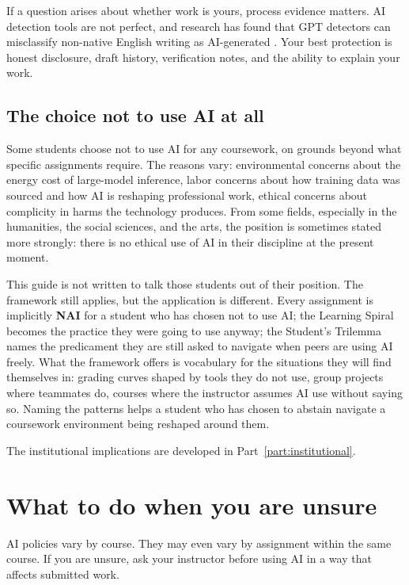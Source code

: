 \documentclass{SIAMbook2023}
\newcommand{\NAI}{\textcolor{catNAI}{\textbf{NAI}}}
\begin{document}
If a question arises about whether work is yours, process evidence matters. AI detection tools are not perfect, and research has found that GPT detectors can misclassify non-native English writing as AI-generated \citep{liang2023gpt}. Your best protection is honest disclosure, draft history, verification notes, and the ability to explain your work.

\subsection{The choice not to use AI at all}
\label{subsec:conscientious-objector}%
%

Some students choose not to use AI for any coursework, on grounds beyond what specific assignments require. The reasons vary: environmental concerns about the energy cost of large-model inference, labor concerns about how training data was sourced and how AI is reshaping professional work, ethical concerns about complicity in harms the technology produces. From some fields, especially in the humanities, the social sciences, and the arts, the position is sometimes stated more strongly: there is no ethical use of AI in their discipline at the present moment.

This guide is not written to talk those students out of their position. The framework still applies, but the application is different. Every assignment is implicitly \NAI{} for a student who has chosen not to use AI; the Learning Spiral becomes the practice they were going to use anyway; the Student's Trilemma names the predicament they are still asked to navigate when peers are using AI freely. What the framework offers is vocabulary for the situations they will find themselves in: grading curves shaped by tools they do not use, group projects where teammates do, courses where the instructor assumes AI use without saying so. Naming the patterns helps a student who has chosen to abstain navigate a coursework environment being reshaped around them.

The institutional implications are developed in Part~\ref{part:institutional}.

\section{What to do when you are unsure}
\label{sec:unsure}

AI policies vary by course. They may even vary by assignment within the same course. If you are unsure, ask your instructor before using AI in a way that affects submitted work.
\end{document}

